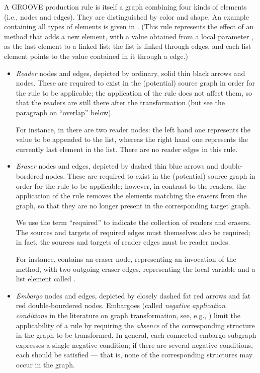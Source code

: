 A GROOVE production rule is itself a graph combining four kinds of elements
(i.e., nodes and edges). They are distinguished by color and shape. An example
containing all types of elements is given in . (This rule
represents the effect of an \Append{} method that adds a new element, with a
value obtained from a local parameter \xx{}, as the last element to a linked
list; the list is linked through \Next{} edges, and each list element points to
the value contained in it through a \Val{} edge.)
%
%
\begin{itemize}
\item \emph{Reader} nodes and edges, depicted by ordinary, solid thin black arrows
  and nodes. These are required to exist in the (potential) source graph in
  order for the rule to be applicable; the application of the rule does not
  affect them, so that the readers are still there after the transformation
  (but see the paragraph on ``overlap'' below).
  
  For instance, in  there are two reader nodes: the left hand one
  represents the value to be appended to the list, whereas the right hand one
  represents the currently last element in the list. There are no reader edges in
  this rule.
  
\item \emph{Eraser} nodes and edges, depicted by dashed thin blue arrows and
  double-bordered nodes. These are required to exist in the (potential) source
  graph in order for the rule to be applicable; however, in contrast to the
  readers, the application of the rule removes the elements matching the
  erasers from the graph, so that they are no longer present in the
  corresponding target graph.
  
  We use the term ``required'' to indicate the collection of
  readers and erasers. The sources and targets of required edges must
  themselves also be required; in fact, the sources and targets of reader edges
  must be reader nodes.

  For instance,  contains an eraser node, representing an
  invocation of the \Append{} method, with two outgoing eraser edges,
  representing the local variable \xx{} and a list element called \This.
  
\item \emph{Embargo} nodes and edges, depicted by closely dashed fat red arrows
  and fat red double-bourdered nodes. Embargoes (called \emph{negative
  application conditions} in the literature on graph transformation, see, e.g.,
  \cite{HabelHecTae1996}) limit the applicability of a rule by requiring the
  \emph{absence} of the corresponding structure in the graph to be transformed.
  In general, each connected embargo subgraph expresses a single negative
  condition; if there are several negative conditions, each should be satisfied
  --- that is, none of the corresponding structures may occur in the graph.
  

\end{itemize}
